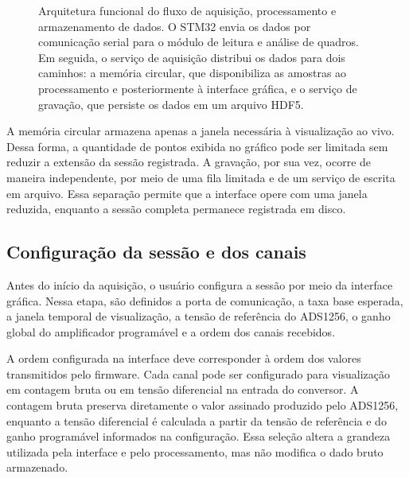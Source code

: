 \documentclass[a4paper,12pt]{fcte}
\begin{document}
\begin{figure}[htbp]
    
    \caption[Fluxo de aquisição, armazenamento e processamento dos dados]{Arquitetura funcional do fluxo de aquisição, processamento e armazenamento de dados. O STM32 envia os dados por comunicação serial para o módulo de leitura e análise de quadros. Em seguida, o serviço de aquisição distribui os dados para dois caminhos: a memória circular, que disponibiliza as amostras ao processamento e posteriormente à interface gráfica, e o serviço de gravação, que persiste os dados em um arquivo HDF5.}
    \label{fig:fluxo-aquisicao}
\end{figure}

A memória circular armazena apenas a janela necessária à visualização ao vivo. Dessa forma, a quantidade de pontos exibida no gráfico pode ser limitada sem reduzir a extensão da sessão registrada. A gravação, por sua vez, ocorre de maneira independente, por meio de uma fila limitada e de um serviço de escrita em arquivo. Essa separação permite que a interface opere com uma janela reduzida, enquanto a sessão completa permanece registrada em disco.

\subsection{Configuração da sessão e dos canais}
\label{subsec:configuracao_sessao_software}

Antes do início da aquisição, o usuário configura a sessão por meio da interface gráfica. Nessa etapa, são definidos a porta de comunicação, a taxa base esperada, a janela temporal de visualização, a tensão de referência do ADS1256, o ganho global do amplificador programável e a ordem dos canais recebidos.

A ordem configurada na interface deve corresponder à ordem dos valores transmitidos pelo firmware. Cada canal pode ser configurado para visualização em contagem bruta ou em tensão diferencial na entrada do conversor. A contagem bruta preserva diretamente o valor assinado produzido pelo ADS1256, enquanto a tensão diferencial é calculada a partir da tensão de referência e do ganho programável informados na configuração. Essa seleção altera a grandeza utilizada pela interface e pelo processamento, mas não modifica o dado bruto armazenado.
\end{document}
